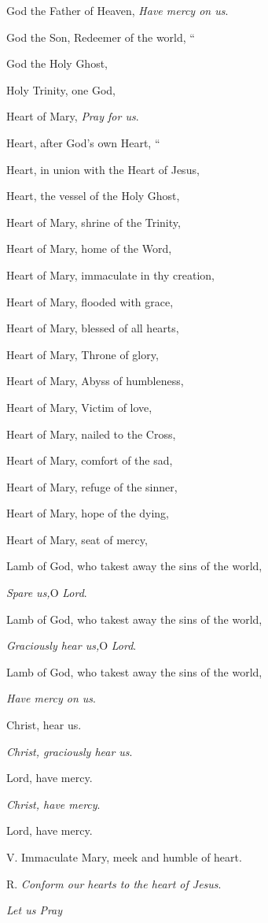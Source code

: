 God the Father of Heaven,
\emph{Have mercy on us}.

God the Son, Redeemer of the world,
``

God the Holy Ghost,

Holy Trinity, one God,

Heart of Mary,
\emph{Pray for us}.

Heart, after God’s own Heart,
``

Heart, in union with the Heart of Jesus,

Heart, the vessel of the Holy Ghost,

Heart of Mary, shrine of the Trinity,

Heart of Mary, home of the Word,

Heart of Mary, immaculate in thy creation,

Heart of Mary, flooded with grace, 

Heart of Mary, blessed of all hearts,

Heart of Mary, Throne of glory,

Heart of Mary, Abyss of humbleness,

Heart of Mary, Victim of love,

Heart of Mary, nailed to the Cross,

Heart of Mary, comfort of the sad,

Heart of Mary, refuge of the sinner,

Heart of Mary, hope of the dying,

Heart of Mary, seat of mercy,

Lamb of God, who takest away the
sins of the world,

\emph{Spare us,}O \emph{Lord}.

Lamb of God, who takest away the sins of the world,

\emph{Graciously hear us,}O \emph{Lord}.

Lamb of God, who takest away the sins of the world,

\emph{Have mercy on us}.

Christ, hear us.

\emph{Christ, graciously hear us}.

Lord, have mercy.

\emph{Christ, have mercy}.

Lord, have mercy.

V. Immaculate Mary, meek and
humble of heart.

R. \emph{Conform our hearts to the heart of Jesus}.

\emph{Let
us Pray}

